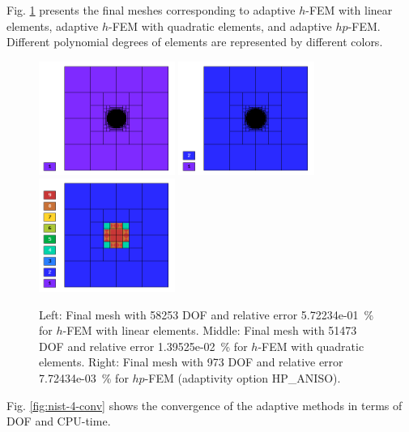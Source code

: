 \documentclass[12pt]{elsarticle}
\begin{document}
Fig. \ref{fig:nist-4-hp-aniso} presents the final meshes corresponding to adaptive $h$-FEM with
linear elements, adaptive $h$-FEM with quadratic elements, and adaptive $hp$-FEM. Different
polynomial degrees of elements are represented by different colors.

\begin{figure}[H]
\centering
\includegraphics[height=3.7cm]{nist/nist-4/mesh_h1_aniso.png}
\includegraphics[height=3.7cm]{nist/nist-4/mesh_h2_aniso.png}
\includegraphics[height=3.7cm]{nist/nist-4/mesh_hp_aniso.png}
\caption{
Left: Final mesh with 58253 DOF and relative error 5.72234e-01~\% for $h$-FEM with linear elements.
Middle: Final mesh with 51473 DOF and relative error 1.39525e-02~\% for $h$-FEM with quadratic elements.
Right: Final mesh with 973 DOF and relative error 7.72434e-03~\% for $hp$-FEM (adaptivity option HP\_ANISO).}
\label{fig:nist-4-hp-aniso}
\end{figure}

Fig. \ref{fig:nist-4-conv} shows the convergence of the adaptive methods in terms of DOF and CPU-time.
\end{document}
